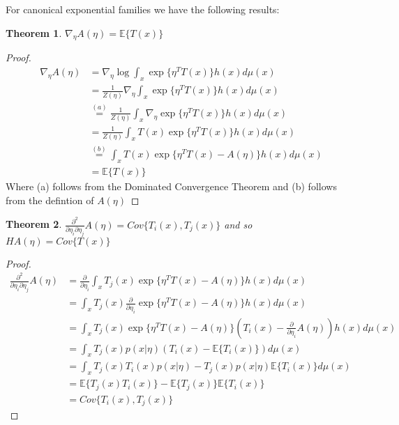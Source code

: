 \documentclass[]{article}
\theoremstyle{mattstyle}
\newtheorem{theorem}{Theorem}[section]
\theoremstyle{definition}
\begin{document}
For canonical exponential families we have the following results:

\begin{theorem}
	$\nabla_{\eta}A(\eta) = \mathbb{E}\{T(x)\}$
\end{theorem}
\begin{proof}
	\begin{align*}
	\nabla_{\eta}A(\eta) &= \nabla_{\eta} \log \int_x \exp\{ \eta^TT(x)\}h(x)d\mu(x)\\
	&= \frac{1}{Z(\eta)}\nabla_{\eta} \int_x \exp\{ \eta^TT(x)\}h(x)d\mu(x)\\
	&\overset{(a)}{=} \frac{1}{Z(\eta)}\int_x \nabla_{\eta} \exp\{ \eta^TT(x)\}h(x)d\mu(x)\\
	&= \frac{1}{Z(\eta)}\int_x T(x)\exp\{ \eta^TT(x)\}h(x)d\mu(x)\\
	&\overset{(b)}{=}\int_x T(x)\exp\{ \eta^TT(x)-A(\eta)\}h(x)d\mu(x)\\
	&=\mathbb{E}\{T(x)\}
	\end{align*}
	Where (a) follows from the Dominated Convergence Theorem and (b) follows from the defintion of $A(\eta)$
\end{proof}

\begin{theorem}
	$\frac{\partial^2}{\partial \eta_i \partial \eta_j}A(\eta) = Cov\{T_i(x),T_j(x)\}$ and so $HA(\eta)=Cov\{T(x)\}$
\end{theorem}
\begin{proof}
	\begin{align*}
	\frac{\partial^2}{\partial \eta_i \partial \eta_j}A(\eta) &= \frac{\partial}{\partial \eta_i}\int_x T_j(x)\exp\{ \eta^TT(x)-A(\eta)\}h(x)d\mu(x)\\
	&= \int_x T_j(x)\frac{\partial}{\partial \eta_i}\exp\{ \eta^TT(x)-A(\eta)\}h(x)d\mu(x)\\
	&= \int_x T_j(x)\exp\{ \eta^TT(x)-A(\eta)\}\left( T_i(x) - \frac{\partial}{\partial \eta_i}A(\eta) \right)h(x)d\mu(x)\\
	&= \int_x T_j(x)p(x|\eta)\left( T_i(x) - \mathbb{E}\{T_i(x)\} \right) d\mu(x)\\
	&= \int_x T_j(x)T_i(x)p(x|\eta) - T_j(x)p(x|\eta)\mathbb{E}\{T_i(x)\} d\mu(x)\\
	&= \mathbb{E}\{T_j(x)T_i(x)\} - \mathbb{E}\{T_j(x)\}\mathbb{E}\{T_i(x)\}\\
	&= Cov\{T_i(x), T_j(x)\}
	\end{align*}
\end{proof}
\end{document}
